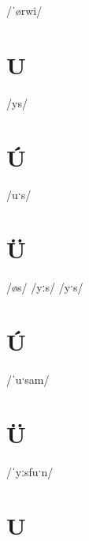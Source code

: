 \documentclass[10pt,a4paper,twoside]{book}
\begin{document}
\begin{multicols}{3}
 {/ˈørwi/} {}
\end{multicols}

\section*{U}

\begin{multicols}{3}
 {/ys/} {}
\end{multicols}

\section*{Ú}

\begin{multicols}{3}
 {/uˑs/} {}
\end{multicols}

\section*{Ü}

\begin{multicols}{3}
 {/øs/} {}
 {/yːs/} {}
 {/yˑs/} {}
\end{multicols}

\section*{Ú}

\begin{multicols}{3}
 {/ˈuˑsam/} {}
\end{multicols}

\section*{Ü}

\begin{multicols}{3}
 {/ˈyːsfuˑn/} {}
\end{multicols}

\section*{U}
\end{document}
